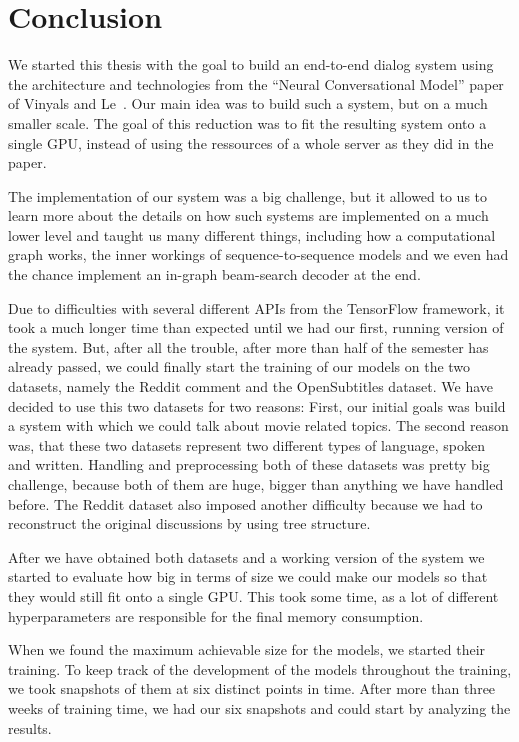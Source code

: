 \chapter{Conclusion}

We started this thesis with the goal to build an end-to-end dialog system using the architecture and technologies from the ``Neural Conversational Model'' paper of Vinyals and Le~\cite{Vinyals:2015}. Our main idea was to build such a system, but on a much smaller scale. The goal of this reduction was to fit the resulting system onto a single GPU, instead of using the ressources of a whole server as they did in the paper.

The implementation of our system was a big challenge, but it allowed to us to learn more about the details on how such systems are implemented on a much lower level and taught us many different things, including how a computational graph works, the inner workings of sequence-to-sequence models and we even had the chance implement an in-graph beam-search decoder at the end.

Due to difficulties with several different APIs from the TensorFlow framework, it took a much longer time than expected until we had our first, running version of the system. But, after all the trouble, after more than half of the semester has already passed, we could finally start the training of our models on the two datasets, namely the Reddit comment and the OpenSubtitles dataset. We have decided to use this two datasets for two reasons: First, our initial goals was build a system with which we could talk about movie related topics. The second reason was, that these two datasets represent two different types of language, spoken and written. Handling and preprocessing both of these datasets was pretty big challenge, because both of them are huge, bigger than anything we have handled before. The Reddit dataset also imposed another difficulty because we had to reconstruct the original discussions by using tree structure.

After we have obtained both datasets and a working version of the system we started to evaluate how big in terms of size we could make our models so that they would still fit onto a single GPU. This took some time, as a lot of different hyperparameters are responsible for the final memory consumption.

When we found the maximum achievable size for the models, we started their training. To keep track of the development of the models throughout the training, we took snapshots of them at six distinct points in time. After more than three weeks of training time, we had our six snapshots and could start by analyzing the results.

